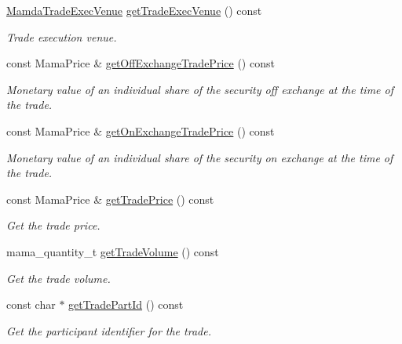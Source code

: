 \begin{CompactItemize}
\hyperlink{namespaceWombat_daf4c098665070a9e45bf835bad3548a}{Mamda\-Trade\-Exec\-Venue} \hyperlink{classWombat_1_1MamdaTradeListener_12aa826e64effedd9e64fcdc95ce8217}{get\-Trade\-Exec\-Venue} () const 
\begin{CompactList}\small\item\em Trade execution venue. \item\end{CompactList}\item 
const Mama\-Price \& \hyperlink{classWombat_1_1MamdaTradeListener_71f698fe02f28a03082e13bc1712520c}{get\-Off\-Exchange\-Trade\-Price} () const 
\begin{CompactList}\small\item\em Monetary value of an individual share of the security off exchange at the time of the trade. \item\end{CompactList}\item 
const Mama\-Price \& \hyperlink{classWombat_1_1MamdaTradeListener_aa798b030e645e17bda3911d1b5a9bf9}{get\-On\-Exchange\-Trade\-Price} () const 
\begin{CompactList}\small\item\em Monetary value of an individual share of the security on exchange at the time of the trade. \item\end{CompactList}\item 
const Mama\-Price \& \hyperlink{classWombat_1_1MamdaTradeListener_f2f5cd501bc1fcb6717a81c001004228}{get\-Trade\-Price} () const 
\begin{CompactList}\small\item\em Get the trade price. \item\end{CompactList}\item 
mama\_\-quantity\_\-t \hyperlink{classWombat_1_1MamdaTradeListener_59830d5b7d9bf0df2e274f8f4ce49cc6}{get\-Trade\-Volume} () const 
\begin{CompactList}\small\item\em Get the trade volume. \item\end{CompactList}\item 
const char $\ast$ \hyperlink{classWombat_1_1MamdaTradeListener_a9e5a20840963992b58ec19cf717cfab}{get\-Trade\-Part\-Id} () const 
\begin{CompactList}\small\item\em Get the participant identifier for the trade. \item\end{CompactList}\item 

\end{CompactItemize}

